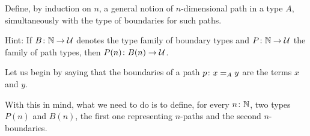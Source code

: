 \begin{exr}
    Define, by induction on\/ $n$, a general notion of\/ $n$-dimensional path in a type\/ $A$, simultaneously with the type of boundaries for such paths.

    {\upshape Hint: If\/ $B\colon\N\to\univ$ denotes the type family of boundary types and\/ $P\colon\N\to\univ$ the family of path types, then\/ $P(n)\colon B(n)\to\univ$.}
\end{exr}

\begin{solution}
    Let us begin by saying that the boundaries of a path $p\colon x\eq Ay$ are the terms $x$ and $y$.

    With this in mind, what we need to do is to define, for every $n\colon\N$, two types $P(n)$ and $B(n)$, the first one representing $n$-paths and the second $n$-boundaries.


\end{solution}
